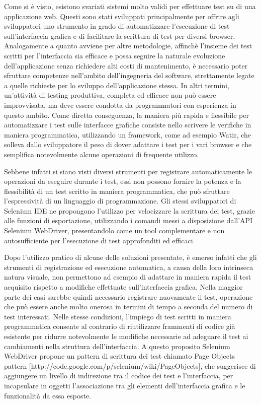 \documentclass[12pt]{toptesi}
\begin{document}
Come si è visto, esistono svariati sistemi molto validi per effettuare test su di una applicazione web. Questi sono stati sviluppati principalmente per offrire agli sviluppatori uno strumento in grado di automatizzare l'esecuzione di test sull'interfaccia grafica e di facilitare la scrittura di test per diversi browser. Analogamente a quanto avviene per altre metodologie, affinchè l'insieme dei test scritti per l'interfaccia sia efficace e possa seguire la naturale evoluzione dell'applicazione senza richiedere alti costi di mantenimento, è necessario poter sfruttare competenze nell'ambito dell'ingegneria del software, strettamente legate a quelle richieste per lo sviluppo dell'applicazione stessa. In altri termini, un'attività di testing produttiva, completa ed efficace non può essere improvvisata, ma deve essere condotta da programmatori con esperienza in questo ambito. Come diretta conseguenza, la maniera più rapida e flessibile per automatizzare i test sulle interfacce grafiche consiste nello scrivere le verifiche in maniera programmatica, utilizzando un framework, come ad esempio Watir, che solleva dallo sviluppatore il peso di dover adattare i test per i vari browser e che semplifica notevolmente alcune operazioni di frequente utilizzo.

Sebbene infatti si siano visti diversi strumenti per registrare automaticamente le operazioni da eseguire durante i test, essi non possono fornire la potenza e la flessibilità di un test scritto in maniera programmatica, che può sfruttare l'espressività di un linguaggio di programmazione. Gli stessi sviluppatori di Selenium IDE ne propongono l'utilizzo per velocizzare la scrittura dei test, grazie alle funzioni di esportazione, utilizzando i comandi messi a disposizione dall'API Selenium WebDriver, presentandolo come un tool complementare e non autosufficiente per l'esecuzione di test approfonditi ed efficaci. 

Dopo l'utilizzo pratico di alcune delle soluzioni presentate, è emerso infatti che gli strumenti di registrazione ed esecuzione automatica, a causa della loro intrinseca natura visuale, non permettono ad esempio di adattare in maniera rapida il test acquisito rispetto a modifiche effettuate sull'interfaccia grafica. Nella maggior parte dei casi sarebbe quindi necessario registrare nuovamente il test, operazione che può essere anche molto onerosa in termini di tempo a seconda del numero di test interessati. Nelle stesse condizioni, l'impiego di test scritti in maniera programmatica consente al contrario di riutilizzare frammenti di codice già esistente per ridurre notevolmente le modifiche necessarie ad adeguare il test ai cambiamenti nella struttura dell'interfaccia. A questo proposito Selenium WebDriver propone un pattern di scrittura dei test chiamato Page Objects pattern [http://code.google.com/p/selenium/wiki/PageObjects], che suggerisce di aggiungere un livello di indirezione tra il codice dei test e l'interfaccia, per incapsulare in oggetti l'associazione tra gli elementi dell'interfaccia grafica e le funzionalità da essa esposte.
\end{document}
